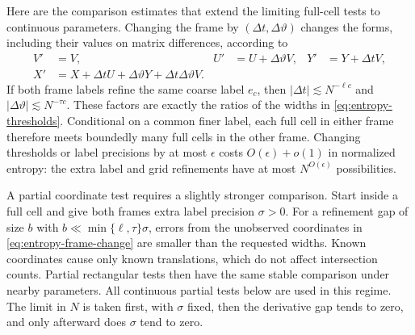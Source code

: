 Here are the comparison estimates that extend the limiting full-cell
tests to continuous parameters.  Changing the frame by
$(\Delta t,\Delta\vartheta)$ changes the forms, including their values
on matrix differences, according to
\begin{align}
 V'&=V,& U'&=U+\Delta\vartheta V,&
 Y'&=Y+\Delta t V,\nonumber\\
 X'&=X+\Delta t U+\Delta\vartheta Y
                      +\Delta t\Delta\vartheta V.
 \label{eq:entropy-frame-change}
\end{align}
If both frame labels refine the same coarse label $e_c$, then
$|\Delta t|\lesssim N^{-\ell c}$ and
$|\Delta\vartheta|\lesssim N^{-\tau c}$.  These factors are exactly
the ratios of the widths in \eqref{eq:entropy-thresholds}.  Conditional
on a common finer label, each full cell in either frame therefore meets
boundedly many full cells in the other frame.  Changing thresholds or
label precisions by at most $\epsilon$ costs
$O(\epsilon)+o(1)$ in normalized entropy: the extra label and grid
refinements have at most $N^{O(\epsilon)}$ possibilities.

A partial coordinate test requires a slightly stronger comparison.
Start inside a full cell and give both frames extra label precision
$\sigma>0$.  For a refinement gap of size $b$ with
$b\ll\min\{\ell,\tau\}\sigma$, errors from the unobserved
coordinates in \eqref{eq:entropy-frame-change} are smaller than the
requested widths.  Known coordinates cause only known translations,
which do not affect intersection counts.  Partial rectangular tests
then have the same stable comparison under nearby parameters.  All
continuous partial tests below are used in this regime.  The limit in
$N$ is taken first, with $\sigma$ fixed, then the derivative gap tends
to zero, and only afterward does $\sigma$ tend to zero.

